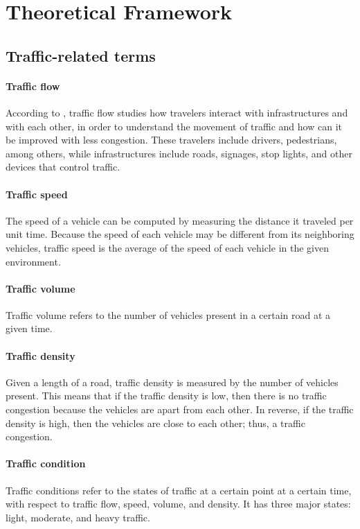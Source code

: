 \chapter{Theoretical Framework}
\label{theoframework}




\section{Traffic-related terms}
\subsubsection{Traffic flow}
According to , traffic flow studies how travelers interact with infrastructures and with each other, in order to understand the movement of traffic and how can it be improved with less congestion. These travelers include drivers, pedestrians, among others, while infrastructures include roads, signages, stop lights, and other devices that control traffic.

\subsubsection{Traffic speed}
The speed of a vehicle can be computed by measuring the distance it traveled per unit time. Because the speed of each vehicle may be different from its neighboring vehicles, traffic speed is the average of the speed of each vehicle in the given environment. 

\subsubsection{Traffic volume}
Traffic volume refers to the number of vehicles present in a certain road at a given time.

\subsubsection{Traffic density}
Given a length of a road, traffic density is measured by the number of vehicles present. This means that if the traffic density is low, then there is no traffic congestion because the vehicles are apart from each other. In reverse, if the traffic density is high, then the vehicles are close to each other; thus, a traffic congestion.

\subsubsection{Traffic condition}
Traffic conditions refer to the states of traffic at a certain point at a certain time, with respect to traffic flow, speed, volume, and density. It has three major states: light, moderate, and heavy traffic.

